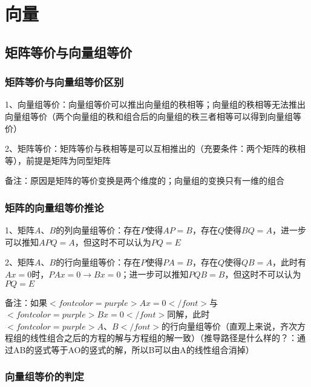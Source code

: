 \chapter{向量}

\section{矩阵等价与向量组等价}



\subsection{矩阵等价与向量组等价区别}

1、向量组等价：向量组等价可以推出向量组的秩相等；向量组的秩相等无法推出向量组等价（两个向量组的秩和组合后的向量组的秩三者相等可以得到向量组等价）

2、矩阵等价：矩阵等价与秩相等是可以互相推出的（充要条件：两个矩阵的秩相等），前提是矩阵为同型矩阵

备注：原因是矩阵的等价变换是两个维度的；向量组的变换只有一维的组合



\subsection{矩阵的向量组等价推论}

1、矩阵$ A、B $的列向量组等价：存在$ P $使得$ AP=B $，存在$ Q $使得$ BQ=A $，进一步可以推知$ APQ=A $，但这时不可以认为$ PQ=E $

2、矩阵$ A、B $的行向量组等价：存在$ P $使得$ PA=B $，存在$ Q $使得$ QB=A $，此时有$ Ax=0 $时，$ PAx=0 \rightarrow Bx=0 $；进一步可以推知$ PQB=B $，但这时不可以认为$ PQ=E $

备注：如果$ <font color=purple>Ax=0</font> $与$ <font color=purple>Bx=0</font> $同解，此时$ <font color=purple>A、B</font> $的行向量组等价（直观上来说，齐次方程组的线性组合之后的方程的解与方程组的解一致）（推导路径是什么样的？：通过AB的竖式等于AO的竖式的解，所以B可以由A的线性组合消掉）



\subsection{向量组等价的判定}

